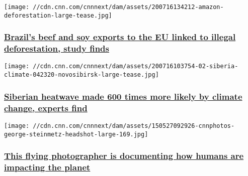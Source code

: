 \href{/2020/07/16/americas/brazil-deforestation-soy-beef-eu-intl-hnk/index.html}{}

\texttt{[image: //cdn.cnn.com/cnnnext/dam/assets/200716134212-amazon-deforestation-large-tease.jpg]}

\hypertarget{brazils-beef-and-soy-exports-to-the-eu-linked-to-illegal-deforestation-study-finds}{%
\subsubsection{\texorpdfstring{\href{/2020/07/16/americas/brazil-deforestation-soy-beef-eu-intl-hnk/index.html}{Brazil's
beef and soy exports to the EU linked to illegal deforestation, study
finds}}{Brazil's beef and soy exports to the EU linked to illegal deforestation, study finds}}\label{brazils-beef-and-soy-exports-to-the-eu-linked-to-illegal-deforestation-study-finds}}

\href{/2020/07/16/world/siberia-heatwave-climate-change-intl-scli-scn/index.html}{}

\texttt{[image: //cdn.cnn.com/cnnnext/dam/assets/200716103754-02-siberia-climate-042320-novosibirsk-large-tease.jpg]}

\hypertarget{siberian-heatwave-made-600-times-more-likely-by-climate-change-experts-find}{%
\subsubsection{\texorpdfstring{\href{/2020/07/16/world/siberia-heatwave-climate-change-intl-scli-scn/index.html}{Siberian
heatwave made 600 times more likely by climate change, experts
find}}{Siberian heatwave made 600 times more likely by climate change, experts find}}\label{siberian-heatwave-made-600-times-more-likely-by-climate-change-experts-find}}

\href{/style/article/george-steinmetz-climate-change-c2e-spc/index.html}{}

\texttt{[image: //cdn.cnn.com/cnnnext/dam/assets/150527092926-cnnphotos-george-steinmetz-headshot-large-169.jpg]}

\hypertarget{this-flying-photographer-is-documenting-how-humans-are-impacting-the-planet}{%
\subsubsection{\texorpdfstring{\href{/style/article/george-steinmetz-climate-change-c2e-spc/index.html}{This
flying photographer is documenting how humans are impacting the
planet}}{This flying photographer is documenting how humans are impacting the planet}}\label{this-flying-photographer-is-documenting-how-humans-are-impacting-the-planet}}

